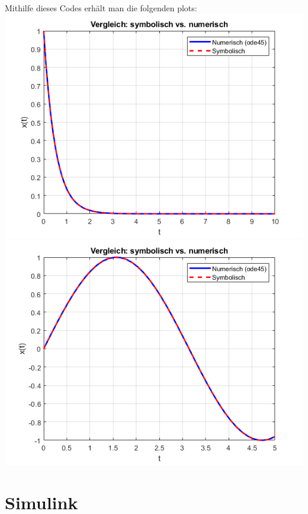 \documentclass{scrartcl}
\begin{document}
Mithilfe dieses Codes erhält man die folgenden plots:\\
\includegraphics[scale=0.6]{radoactiv.png}\\
\includegraphics[scale=0.6]{pendel.png}\\

\section*{Simulink}
\end{document}
